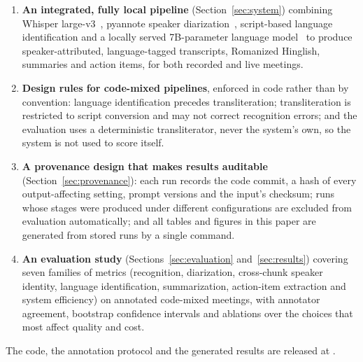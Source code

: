 \begin{enumerate}
  \item \textbf{An integrated, fully local pipeline}
    (Section~\ref{sec:system}) combining Whisper large-v3~\cite{radford2023whisper},
    pyannote speaker diarization~\cite{bredin2020pyannote,plaquet2023powerset},
    script-based language identification and a locally served
    7B-parameter language model~\cite{qwen2024qwen25} to produce speaker-attributed,
    language-tagged transcripts, Romanized Hinglish, summaries and action items,
    for both recorded and live meetings.
  \item \textbf{Design rules for code-mixed pipelines}, enforced in code rather
    than by convention: language identification precedes transliteration;
    transliteration is restricted to script conversion and may not correct
    recognition errors; and the evaluation uses a deterministic transliterator,
    never the system's own, so the system is not used to score itself.
  \item \textbf{A provenance design that makes results auditable}
    (Section~\ref{sec:provenance}): each run records the code commit, a hash of
    every output-affecting setting, prompt versions and the input's checksum;
    runs whose stages were produced under different configurations are excluded
    from evaluation automatically; and all tables and figures in this paper are
    generated from stored runs by a single command.
  \item \textbf{An evaluation study} (Sections~\ref{sec:evaluation}
    and~\ref{sec:results}) covering seven families of metrics (recognition,
    diarization, cross-chunk speaker identity, language identification,
    summarization, action-item extraction and system efficiency) on
     annotated code-mixed meetings, with annotator agreement,
    bootstrap confidence intervals and ablations over the choices that most
    affect quality and cost.
\end{enumerate}

The code, the annotation protocol and the generated results are released at
.
